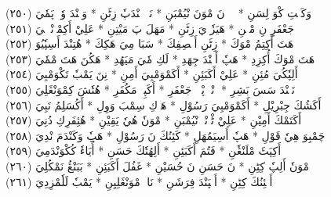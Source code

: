 \documentclass[a4paper, 10pt]{report}
\begin{document}
\begin{center}
\textarabic{(٢٥٠) \textcolor{mygreen}{وَكَكٖتِ كْوَ لِسَنِ  * يٖيٖ نَ مْوَنَ نْيُمْبَنِ  * نَوٖ نٖنْدَپٗ زِٹَنِ  * وَچٖنْدَ وٗتٖ پَمٗيَ }} 
\\[5mm] 

\textarabic{(٢٥١) \textcolor{mygreen}{جَعْفَرِ نِ مْڠٖنِ  * هَيَزٗوٖيَ زِٹَنِ  * مَهَلَ پَ مَيْتِنِ  * عَلِيْ أَكِمْوٖنْدٖلٖيَ }} 
\\[5mm] 

\textarabic{(٢٥٢) \textcolor{mygreen}{هَتَ أَكِتِمُ مْوَكَ  * زِٹَنِ أَمٖصِفِكَ  * سَبَا مِيَ هَكِكَ  * هُتِنْدَ أَسِپٗيُوَ }} 
\\[5mm] 

\textarabic{(٢٥٣) \textcolor{mygreen}{هَتَ مْوَكَ أُكِزِدِ  * هَپٗ أَكٖنْدَ جِهَدِ  * لَكِ مٗيَ مَيَهُدِ  * هَكُنَ هَتَ مْمٗيَ }} 
\\[5mm] 

\textarabic{(٢٥٤) \textcolor{mygreen}{أَلِپٗكُيَ مُئِنِ  * عَلِيْ أَكَبَئِنِ  * أَكَمْوَمْبِيَ أَمِنِ  * نِنَ يَمْبٗ تَكْوَمْبِيَ }} 
\\[5mm] 

\textarabic{(٢٥٥) \textcolor{mygreen}{نَپٖنْدَ سَسَ بَشِرِ  * إٖنْدٖ پْوٖكٖ جَعْفَرِ  * أَكَپِجٖ مَكُفَرِ  * هُتٗشَ كِمْوَنْڠَلِيَ }} 
\\[5mm] 

\textarabic{(٢٥٦) \textcolor{mygreen}{أَكَشُكَ جِبْرِيْلِ  * أَكَمْوَمْبِيَ رَسُوْلِ  * هَوٖكِ سِمْبَ وَوِلِ  * أَكُسَلِمُ نَبِيَ }} 
\\[5mm] 

\textarabic{(٢٥٧) \textcolor{mygreen}{أَكَتَمْكَ أَمِيْنِ  * عَلِيْ ٹْوٖنْدٖ نْيُمْبَنِ  * مْوَنٗ هُيٗ يَقِيْنِ  * هُئِفَرِكِ دُنِيَ }} 
\\[5mm] 

\textarabic{(٢٥٨) \textcolor{mygreen}{چَمْبِوَ هِيٗ قَوْلِ  * هَپٗ أَسِيَمُهَلِ  * كَئِنُكَ نَ رَسُوْلِ  * هَپٗ وَكَنْدَمَ نْدِيَ }} 
\\[5mm] 

\textarabic{(٢٥٩) \textcolor{mygreen}{أَكِپَٹَ مْلَنْڠٗنِ  * فَتُمَ أَكَبَئِنِ  * أَلِهُتٗكَ حَسَنِ  * أُيَاءٗ كُكْوَنْدَمِيَ }} 
\\[5mm] 

\textarabic{(٢٦٠) \textcolor{mygreen}{مْوَنٗ أَلِپٗ كِٹِنِ  * نَ حَسَنِ نَ حُسَيْنِ  * غَفُلَ أَكَبَئِنِ  * بَبَنْڠُ نَمْكُلِيَ }} 
\\[5mm] 

\textarabic{(٢٦١) \textcolor{mygreen}{أَمٖئِنُكَ كِٹِنِ  * أَمٖپَنْدَ فِرَشَنِ  * نَاءٖ مْوَنْڠَلِيِنِ  * يَمْبٗ لَلٗمْزِدِيَ }} 
\\[5mm] 


\end{center}
\end{document}
